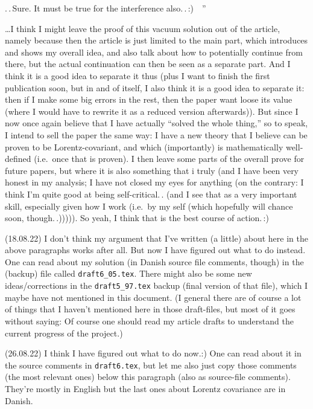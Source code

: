 \documentclass{report}
\begin{document}
.\,.\,Sure. It must be true for the interference also.\,.\,:)\ \ ''

\ldots I think I might leave the proof of this vacuum solution out of the article, namely because then the article is just limited to the main part, which introduces and shows my overall idea, and also talk about how to potentially continue from there, but the actual continuation can then be seen as a separate part. And I think it is a good idea to separate it thus (plus I want to finish the first publication soon, but in and of itself, I also think it is a good idea to separate it: then if I make some big errors in the rest, then the paper want loose its value (where I would have to rewrite it as a reduced version afterwards)). But since I now once again believe that I have actually ``solved the whole thing,'' so to speak, I intend to sell the paper the same way: I have a new theory that I believe can be proven to be Lorentz-covariant, and which (importantly) is mathematically well-defined (i.e.\ once that is proven). I then leave some parts of the overall prove for future papers, but where it is also something that i truly (and I have been very honest in my analysis; I have not closed my eyes for anything (on the contrary: I think I'm quite good at being self-critical.\,. (and I see that as a very important skill, especially given how I work (i.e.\ by my self (which hopefully will chance soon, though.\,.))))). So yeah, I think that is the best course of action.\,:)


(18.08.22) I don't think my argument that I've written (a little) about here in the above paragraphs works after all. But now I have figured out what to do instead. One can read about my solution (in Danish source file comments, though) in the (backup) file called \texttt{draft6\_05.tex}. There might also be some new ideas/corrections in the \texttt{draft5\_97.tex} backup (final version of that file), which I maybe have not mentioned in this document. (I general there are of course a lot of things that I haven't mentioned here in those draft-files, but most of it goes without saying: Of course one should read my article drafts to understand the current progress of the project.) %

(26.08.22) I think I have figured out what to do now.:) One can read about it in the source comments in \texttt{draft6.tex}, but let me also just copy those comments (the most relevant ones) below this paragraph (also as source-file comments). They're mostly in English but the last ones about Lorentz covariance are in Danish. 
\end{document}
